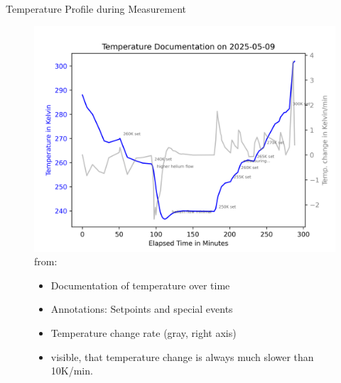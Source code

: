 \documentclass[handout]{beamer} %
\newcommand{\figciteweb}[1]{\\[-3mm]{\tiny from: \citeauthortitle{#1}}}
\begin{document}
    \begin{frame}{Temperature Profile during Measurement}
      \begin{figure}
        \begin{minipage}{0.55\textwidth}
          \centering
          \includegraphics[width=\linewidth, keepaspectratio, height=0.85\textheight]{2025-05-09 TCBC 1400nm ProofOfConcept/Temperature Documentation/temperature_documentation.png}
          \figciteweb{TempMeas}
        \end{minipage}
        \hfill
        \begin{minipage}{0.4\textwidth}
          \begin{itemize}
            \item Documentation of temperature over time
            \item Annotations: Setpoints and special events
            \item Temperature change rate (gray, right axis)
            \item visible, that temperature change is always much slower than 10K/min.
          \end{itemize}
        \end{minipage}
      \end{figure}
    \end{frame}
\end{document}
